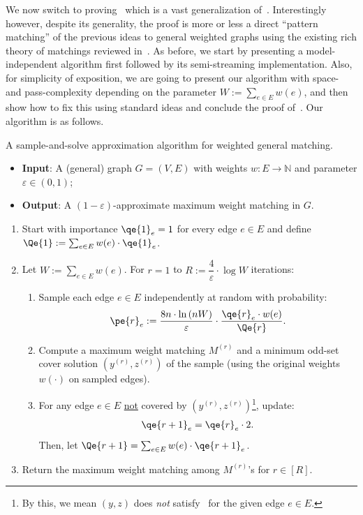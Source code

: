 \documentclass{theoretics}
\newcommand{\eps}{\varepsilon}
\newcommand{\IN}{\mathbb{N}}
\begin{document}
We now switch to proving~ which is a vast generalization of~. Interestingly however, 
despite its generality, the proof is more or less a direct ``pattern matching'' of the previous ideas to general weighted graphs using 
the existing rich theory of matchings reviewed in~. As before, we start by presenting a model-independent algorithm first followed by its semi-streaming implementation. Also, for simplicity of exposition, we are going to present our algorithm 
with space- and pass-complexity depending on the parameter $W := \sum_{e \in E} w(e)$, and then show how to fix this using
standard ideas and conclude the proof of~. Our algorithm is as follows. 


\begin{Algorithm}\label{alg:general}
A sample-and-solve approximation algorithm for weighted general matching. 

\begin{itemize}
	\item \textbf{Input}: A (general) graph $G=(V,E)$ with weights $w: E \rightarrow \IN$ and parameter $\eps \in (0,1)$; 
	\item \textbf{Output}: A $(1-\eps)$-approximate maximum weight matching in $G$. 
\end{itemize}

	\begin{enumerate}
	\item Start with {importance} $\qe{1}_e = 1$ for every edge $e \in E$ and define $\Qe{1} := \sum_{e \in E} w(e) \cdot \qe{1}_e$. 
	\item Let $W:= \sum_{e \in E} w(e)$. For $r=1$ to $R := \dfrac{4}{\eps} \cdot \log{W}$ iterations: 
	\begin{enumerate}
	\item Sample each edge $e \in E$ independently at random with probability:
	\begin{align}
		\pe{r}_e := {\frac{8n \cdot \ln{(nW)}}{\eps} \cdot \frac{\qe{r}_e \cdot w(e)}{\Qe{r}}}. \label{eq:pe-general}
	\end{align}
	\item\label{line:2-general} Compute a maximum weight matching $M^{(r)}$ and a minimum odd-set cover solution $(y^{(r)},z^{(r)})$ of the sample (using the original weights $w(\cdot)$ on sampled edges). 
	\item\label{line:we-defined-this} For any edge $e \in E$ \underline{not} covered by $(y^{(r)},z^{(r)})$\footnote{By this, we mean $(y,z)$ does \emph{not} satisfy~ for the given edge $e \in E$.}, update: 
	\begin{align}
		\qe{r+1}_e = \qe{r}_e \cdot 2. \label{eq:qe-general}
	\end{align}
	Then, let $\Qe{r+1} = \sum_{e \in E} w(e) \cdot \qe{r+1}_e$. 
	\end{enumerate}
	\item Return the maximum weight matching among $M^{(r)}$'s for $r \in [R]$. 
	\end{enumerate}
\end{Algorithm}
\end{document}
